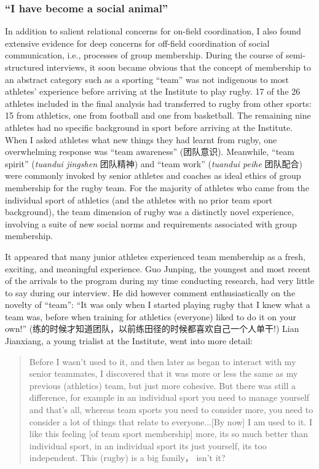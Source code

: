\begin{CJK}{UTF8}{gbsn}
 \subsubsection{``I have become a social animal''\label{sect:socialAnimal}}
In addition to salient relational concerns for on-field coordination, I also found extensive evidence for deep concerns for off-field coordination of social communication, i.e., processes of group membership.  During the course of semi-structured interviews, it soon became obvious that the concept of membership to an abstract category such as a sporting ``team'' was not indigenous to most athletes' experience before arriving at the Institute to play rugby.  17 of the 26 athletes included in the final analysis had transferred to rugby from other sports: 15 from athletics, one from football and one from basketball.  The remaining nine athletes had no specific background in sport before arriving at the Institute.
When I asked athletes what new things they had learnt from rugby, one overwhelming response was ``team awareness'' (团队意识).
Meanwhile, ``team spirit'' (\textit{tuandui jingshen} 团队精神) and ``team work'' (\textit{tuandui peihe} 团队配合) were commonly invoked by senior athletes and coaches as ideal ethics of group membership for the rugby team. For the majority of athletes who came from the individual sport of athletics (and the athletes with no prior team sport background), the team dimension of rugby was a distinctly novel experience, involving a suite of new social norms and requirements associated with group membership.

It appeared that many junior athletes experienced team membership as a fresh, exciting, and meaningful experience.  Guo Junping, the youngest and most recent of the arrivals to the program during my time conducting research, had very little to say during our interview.  He did however comment enthusiastically on the novelty of ``team'': ``It was only when I started playing rugby that I knew what a team was, before when training for athletics (everyone) liked to do it on your own!'' (练的时候才知道团队，以前练田径的时候都喜欢自己一个人单干!) Lian Jianxiang, a young trialist at the Institute, went into more detail:

  \begin{quote}
   Before I wasn't used to it, and then later as began to interact with my senior teammates, I discovered that it was more or less the same as my previous (athletics) team, but just more cohesive.  But there was still a difference, for example in an individual sport you need to manage yourself and that's all, whereas team sports you need to consider more, you need to consider a lot of things that relate to everyone...[By now] I am used to it. I like this feeling [of team sport membership] more, its so much better than individual sport, in an individual sport its just yourself, its too independent. This (rugby) is a big family， isn't it?
  \end{quote}


\end{CJK}
